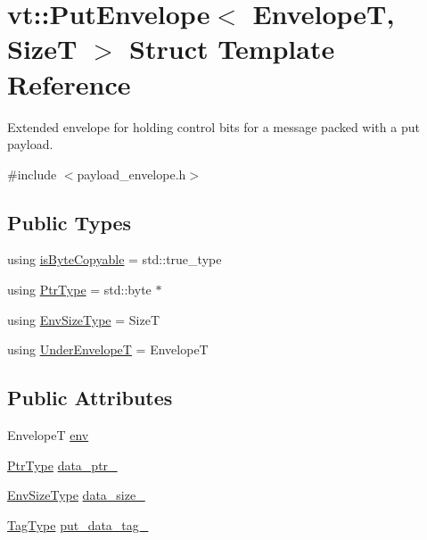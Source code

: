 \hypertarget{structvt_1_1_put_envelope}{}\section{vt\+:\+:Put\+Envelope$<$ EnvelopeT, SizeT $>$ Struct Template Reference}
\label{structvt_1_1_put_envelope}


Extended envelope for holding control bits for a message packed with a put payload.  




{\ttfamily \#include $<$payload\+\_\+envelope.\+h$>$}

\subsection*{Public Types}
\begin{DoxyCompactItemize}
\item 
using \hyperlink{structvt_1_1_put_envelope_a64bb0e1e7e7db39c62edbc9ee312fc24}{is\+Byte\+Copyable} = std\+::true\+\_\+type
\item 
using \hyperlink{structvt_1_1_put_envelope_a19b17e2c7298ec892cd5a948d0a2d7f4}{Ptr\+Type} = std\+::byte $\ast$
\item 
using \hyperlink{structvt_1_1_put_envelope_ad086e484eb23ab04b0a055aff2cb7b19}{Env\+Size\+Type} = SizeT
\item 
using \hyperlink{structvt_1_1_put_envelope_a8e9e6c105983442674c194da5712df28}{Under\+EnvelopeT} = EnvelopeT
\end{DoxyCompactItemize}
\subsection*{Public Attributes}
\begin{DoxyCompactItemize}
\item 
EnvelopeT \hyperlink{structvt_1_1_put_envelope_a046a6ec334cde93251c21eded8d3fbc4}{env}
\item 
\hyperlink{structvt_1_1_put_envelope_a19b17e2c7298ec892cd5a948d0a2d7f4}{Ptr\+Type} \hyperlink{structvt_1_1_put_envelope_a6cba549a8e4a1fd5ff577979bad80300}{data\+\_\+ptr\+\_\+}
\item 
\hyperlink{structvt_1_1_put_envelope_ad086e484eb23ab04b0a055aff2cb7b19}{Env\+Size\+Type} \hyperlink{structvt_1_1_put_envelope_a1f30fc6ecbceff781ad132605c453b56}{data\+\_\+size\+\_\+}
\item 
\hyperlink{namespacevt_a84ab281dae04a52a4b243d6bf62d0e52}{Tag\+Type} \hyperlink{structvt_1_1_put_envelope_ac4a0614fbf3e30fcdeb13a376ccacffe}{put\+\_\+data\+\_\+tag\+\_\+}
\end{DoxyCompactItemize}



